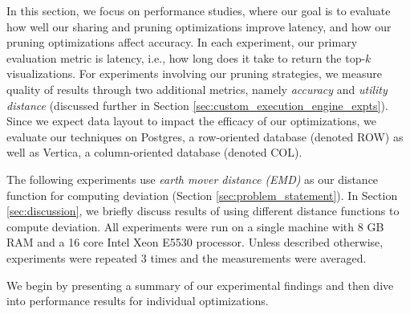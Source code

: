 In this section, we focus on performance studies, where our goal is to evaluate how well our sharing and pruning
optimizations improve latency, and how our pruning optimizations affect accuracy.
In each experiment, our primary evaluation metric is latency, i.e., 
how long does it take \SeeDB to return the top-$k$ visualizations. 
For experiments involving our pruning strategies, we measure quality of results through two additional
metrics, namely {\it accuracy} and {\it utility distance} (discussed further in Section 
\ref{sec:custom_execution_engine_expts}).
Since we expect data layout to impact the efficacy of our optimizations, we 
evaluate our techniques on Postgres, a row-oriented database (denoted ROW) as well as Vertica, 
a column-oriented database (denoted COL).

The following experiments use {\it earth mover distance (EMD)} as our distance function for
computing deviation (Section \ref{sec:problem_statement}).
In Section \ref{sec:discussion}, we briefly discuss results of using different distance functions to
compute deviation.
All experiments were run on a single machine with 8 GB RAM and a 16 core Intel 
Xeon E5530 processor. 
Unless described otherwise, experiments were repeated 3 times and the measurements 
were averaged.

We begin by presenting a summary of our experimental findings and then dive into performance results 
for individual optimizations.












